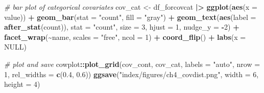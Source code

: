 \documentclass[12pt, twoside]{amherstthesis}
\newenvironment{Shaded}{\begin{snugshade}}{\end{snugshade}}
\newcommand{\AttributeTok}[1]{\textcolor[rgb]{0.13,0.29,0.53}{#1}}
\newcommand{\CommentTok}[1]{\textcolor[rgb]{0.56,0.35,0.01}{\textit{#1}}}
\newcommand{\ConstantTok}[1]{\textcolor[rgb]{0.56,0.35,0.01}{#1}}
\newcommand{\DecValTok}[1]{\textcolor[rgb]{0.00,0.00,0.81}{#1}}
\newcommand{\FloatTok}[1]{\textcolor[rgb]{0.00,0.00,0.81}{#1}}
\newcommand{\FunctionTok}[1]{\textcolor[rgb]{0.13,0.29,0.53}{\textbf{#1}}}
\newcommand{\NormalTok}[1]{#1}
\newcommand{\OtherTok}[1]{\textcolor[rgb]{0.56,0.35,0.01}{#1}}
\newcommand{\SpecialCharTok}[1]{\textcolor[rgb]{0.81,0.36,0.00}{\textbf{#1}}}
\newcommand{\StringTok}[1]{\textcolor[rgb]{0.31,0.60,0.02}{#1}}
\begin{document}
\begin{Shaded}
\begin{Highlighting}[]
\CommentTok{\# bar plot of categorical covariates}
\NormalTok{cov\_cat }\OtherTok{\textless{}{-}}\NormalTok{ df\_forcovcat }\SpecialCharTok{|\textgreater{}} 
  \FunctionTok{ggplot}\NormalTok{(}\FunctionTok{aes}\NormalTok{(}\AttributeTok{x =}\NormalTok{ value)) }\SpecialCharTok{+}
  \FunctionTok{geom\_bar}\NormalTok{(}\AttributeTok{stat =} \StringTok{"count"}\NormalTok{, }\AttributeTok{fill =} \StringTok{"gray"}\NormalTok{) }\SpecialCharTok{+}
  \FunctionTok{geom\_text}\NormalTok{(}\FunctionTok{aes}\NormalTok{(}\AttributeTok{label =} \FunctionTok{after\_stat}\NormalTok{(count)), }\AttributeTok{stat =} \StringTok{"count"}\NormalTok{, }
             \AttributeTok{size =} \DecValTok{3}\NormalTok{, }\AttributeTok{hjust =} \DecValTok{1}\NormalTok{, }\AttributeTok{nudge\_y =} \SpecialCharTok{{-}}\DecValTok{2}\NormalTok{) }\SpecialCharTok{+}
  \FunctionTok{facet\_wrap}\NormalTok{(}\SpecialCharTok{\textasciitilde{}}\NormalTok{name, }\AttributeTok{scales =} \StringTok{"free"}\NormalTok{, }\AttributeTok{ncol =} \DecValTok{1}\NormalTok{) }\SpecialCharTok{+}
  \FunctionTok{coord\_flip}\NormalTok{() }\SpecialCharTok{+}
  \FunctionTok{labs}\NormalTok{(}\AttributeTok{x =} \ConstantTok{NULL}\NormalTok{)}

\CommentTok{\# plot and save}
\NormalTok{cowplot}\SpecialCharTok{::}\FunctionTok{plot\_grid}\NormalTok{(cov\_cont, cov\_cat, }\AttributeTok{labels =} \StringTok{"auto"}\NormalTok{, }\AttributeTok{nrow =} \DecValTok{1}\NormalTok{, }
                   \AttributeTok{rel\_widths =} \FunctionTok{c}\NormalTok{(}\FloatTok{0.4}\NormalTok{, }\FloatTok{0.6}\NormalTok{))}
\FunctionTok{ggsave}\NormalTok{(}\StringTok{"index/figures/ch4\_covdist.png"}\NormalTok{, }\AttributeTok{width =} \DecValTok{6}\NormalTok{, }\AttributeTok{height =} \DecValTok{4}\NormalTok{)}
\end{Highlighting}
\end{Shaded}
\normalsize
\end{document}
